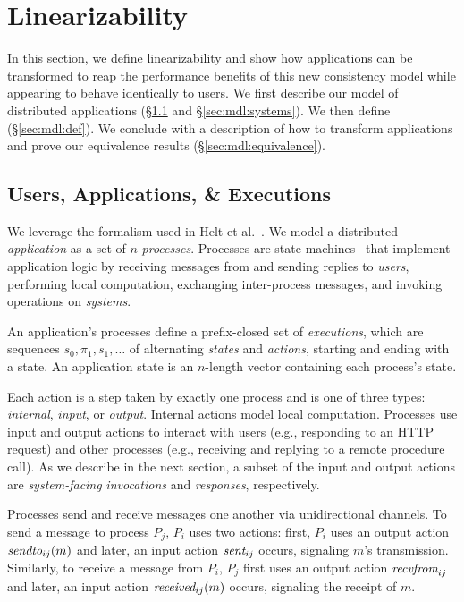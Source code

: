 \section{\Multidispatch{} Linearizability}
\label{sec:mdl}

In this section, we define \multidispatch{} linearizability and show how
applications can be transformed to reap the performance benefits of this
new consistency model while appearing to behave identically to users.
We first describe our model of distributed applications
(\S\ref{sec:mdl:applications} and \S\ref{sec:mdl:systems}).
We then define \MDL{} (\S\ref{sec:mdl:def}). We conclude with a description
of how to transform applications and prove our equivalence results
(\S\ref{sec:mdl:equivalence}).

\subsection{Users, Applications, \& Executions}
\label{sec:mdl:applications}

We leverage the formalism used in Helt et al.~\cite{helt2021rss}. We model a
distributed \textit{application} as a set of $n$ \textit{processes}.
Processes are state machines~\cite{lynch1987ioa,lynch1996da}
that implement application logic by receiving messages from and sending replies
to \textit{users}, performing local computation, exchanging inter-process
messages, and invoking operations on \textit{systems}.

An application's processes define a prefix-closed set of \textit{executions},
which are sequences $s_0,\pi_1,s_1,\ldots$ of alternating \textit{states} and
\textit{actions}, starting and ending with a state. An application state
is an $n$-length vector containing each process's state.

Each action is a step taken by exactly one process and is one of three types:
\textit{internal}, \textit{input}, or \textit{output}. Internal actions model
local computation. Processes use input and output actions to interact with
users (e.g., responding to an HTTP request) and other
processes (e.g., receiving and replying to a remote procedure call).
As we describe in the next section, a subset of the input and output actions
are \textit{system-facing} \textit{invocations} and \textit{responses}, 
respectively.

Processes send and receive messages one another via unidirectional
channels. To send a message to process $P_j$, $P_i$ uses two
actions: first, $P_i$ uses an output action $\operatorname*{\operatorname*{\textit{sendto}}}_{ij}(m)$
and later, an input action $\operatorname*{\textit{sent}}_{ij}$ occurs, signaling $m$'s 
transmission. Similarly, to receive a message from $P_i$, $P_j$ first
uses an output action $\operatorname*{\textit{recvfrom}}_{ij}$ and later, an input action
$\operatorname*{\textit{received}}_{ij}(m)$ occurs, signaling the receipt of $m$.


